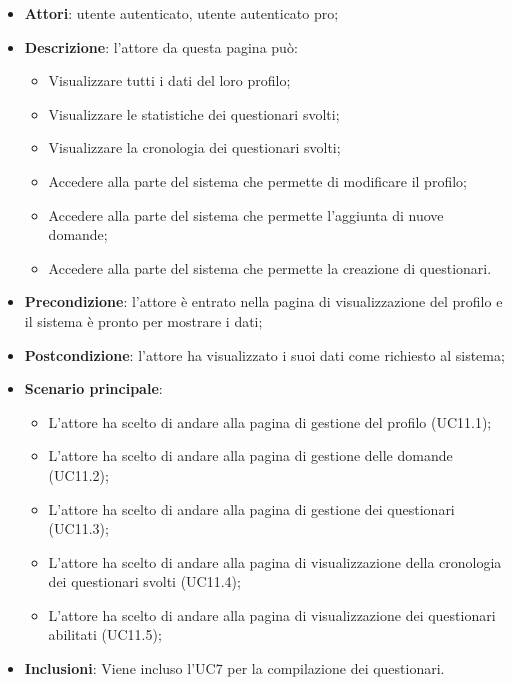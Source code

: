 \begin{itemize}
\item\textbf{Attori}: utente autenticato, utente autenticato pro;
\item\textbf{Descrizione}: l'attore da questa pagina può: 
\begin{itemize}
	\item Visualizzare tutti i dati del loro profilo;
	\item Visualizzare le statistiche dei questionari svolti;
	\item Visualizzare la cronologia dei questionari svolti;
	\item Accedere alla parte del sistema che permette di modificare il profilo;
	\item Accedere alla parte del sistema che permette l'aggiunta di nuove domande;
	\item Accedere alla parte del sistema che permette la creazione di questionari.
\end{itemize}
\item\textbf{Precondizione}: l'attore è entrato nella pagina di visualizzazione del profilo e il sistema è pronto per mostrare i dati;
\item\textbf{Postcondizione}: l'attore ha visualizzato i suoi dati come richiesto al sistema;
\item\textbf{Scenario principale}:
\begin{itemize}
\item L'attore ha scelto di andare alla pagina di gestione del profilo (UC11.1);
\item L'attore ha scelto di andare alla pagina di gestione delle domande (UC11.2);  
\item L'attore ha scelto di andare alla pagina di gestione dei questionari (UC11.3);
\item L'attore ha scelto di andare alla pagina di visualizzazione della cronologia dei questionari svolti (UC11.4);
\item L'attore ha scelto di andare alla pagina di visualizzazione dei questionari abilitati (UC11.5);
\end{itemize}
\item\textbf{Inclusioni}: Viene incluso l'UC7 per la compilazione dei questionari.
\end{itemize}

